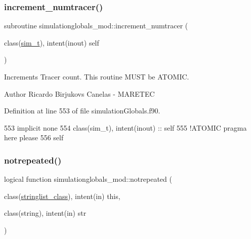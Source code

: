 \subsubsection{\texorpdfstring{increment\+\_\+numtracer()}{increment\_numtracer()}}
{\footnotesize\ttfamily subroutine simulationglobals\+\_\+mod\+::increment\+\_\+numtracer (\begin{DoxyParamCaption}\item[{class(\mbox{\hyperlink{structsimulationglobals__mod_1_1sim__t}{sim\+\_\+t}}), intent(inout)}]{self }\end{DoxyParamCaption})\hspace{0.3cm}{\ttfamily [private]}}



Increments Tracer count. This routine M\+U\+ST be A\+T\+O\+M\+IC. 

\begin{DoxyAuthor}{Author}
Ricardo Birjukovs Canelas -\/ M\+A\+R\+E\+T\+EC 
\end{DoxyAuthor}


Definition at line 553 of file simulation\+Globals.\+f90.


\begin{DoxyCode}
553     \textcolor{keywordtype}{implicit none}
554     \textcolor{keywordtype}{class}(sim\_t), \textcolor{keywordtype}{intent(inout)} :: self
555     \textcolor{comment}{!ATOMIC pragma here please}
556     self%
\end{DoxyCode}
\mbox{\label{namespacesimulationglobals__mod_a12410ee549ead4c6d892dca6ead74d15}} 
\subsubsection{\texorpdfstring{notrepeated()}{notrepeated()}}
{\footnotesize\ttfamily logical function simulationglobals\+\_\+mod\+::notrepeated (\begin{DoxyParamCaption}\item[{class(\mbox{\hyperlink{structsimulationglobals__mod_1_1stringlist__class}{stringlist\+\_\+class}}), intent(in)}]{this,  }\item[{class(string), intent(in)}]{str }\end{DoxyParamCaption})\hspace{0.3cm}{\ttfamily [private]}}



